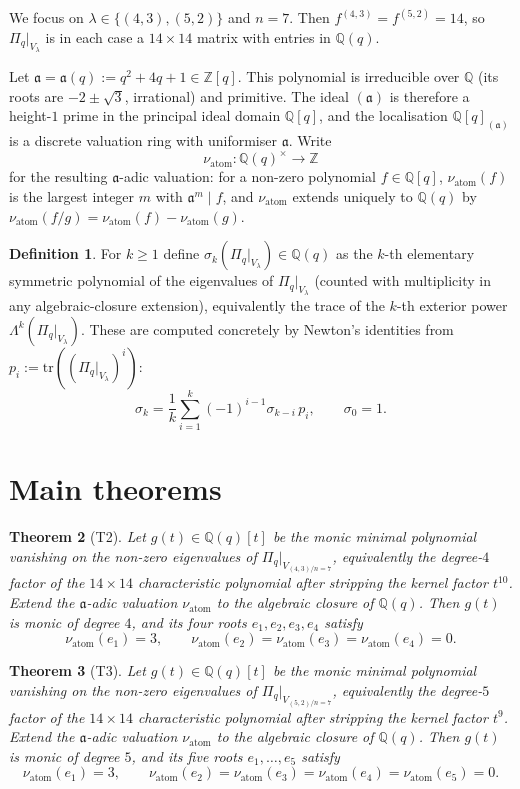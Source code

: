\documentclass[11pt]{article}
\theoremstyle{plain}
\newtheorem{theorem}{Theorem}
\theoremstyle{definition}
\newtheorem{definition}[theorem]{Definition}
\theoremstyle{remark}
\newcommand{\Z}{\mathbb{Z}}
\newcommand{\Q}{\mathbb{Q}}
\newcommand{\Pibs}{\Pi_q}
\newcommand{\Vlam}{V_\lambda}
\newcommand{\trace}{\mathrm{tr}}
\newcommand{\val}{\nu_{\mathrm{atom}}}
\newcommand{\atom}{\mathfrak{a}}
\begin{document}
We focus on $\lambda \in \{(4,3), (5,2)\}$ and $n = 7$.  Then $f^{(4,3)} = f^{(5,2)} = 14$,
so $\Pibs|_{V_\lambda}$ is in each case a $14\times 14$ matrix with entries in $\Q(q)$.

Let $\atom = \atom(q) := q^2 + 4q + 1 \in \Z[q]$.  This polynomial is irreducible
over $\Q$ (its roots are $-2 \pm \sqrt{3}$, irrational) and primitive.  The
ideal $(\atom)$ is therefore a height-$1$ prime in the principal ideal domain
$\Q[q]$, and the localisation $\Q[q]_{(\atom)}$ is a discrete valuation ring with
uniformiser $\atom$.  Write
\[ \val \colon \Q(q)^\times \longrightarrow \Z \]
for the resulting $\atom$-adic valuation: for a non-zero polynomial $f \in \Q[q]$,
$\val(f)$ is the largest integer $m$ with $\atom^m \mid f$, and $\val$ extends
uniquely to $\Q(q)$ by $\val(f/g) = \val(f) - \val(g)$.

\begin{definition}
For $k \geq 1$ define $\sigma_k(\Pibs|_{\Vlam}) \in \Q(q)$ as the $k$-th elementary
symmetric polynomial of the eigenvalues of $\Pibs|_{\Vlam}$ (counted with
multiplicity in any algebraic-closure extension), equivalently the trace of the
$k$-th exterior power $\Lambda^k(\Pibs|_{\Vlam})$.  These are computed concretely
by Newton's identities from $p_i := \trace((\Pibs|_{\Vlam})^i)$:
\[ \sigma_k = \frac{1}{k}\sum_{i=1}^{k} (-1)^{i-1} \sigma_{k-i}\, p_i,
   \qquad \sigma_0 = 1. \]
\end{definition}

\section{Main theorems}

\begin{theorem}[T2]
\label{thm:T2}
Let $g(t) \in \Q(q)[t]$ be the monic minimal polynomial vanishing on the non-zero
eigenvalues of $\Pibs|_{V_{(4,3)/n=7}}$, equivalently the degree-$4$ factor of the
$14\times 14$ characteristic polynomial after stripping the kernel factor $t^{10}$.
Extend the $\atom$-adic valuation $\val$ to the algebraic closure of $\Q(q)$.
Then $g(t)$ is monic of degree $4$, and its four roots $e_1, e_2, e_3, e_4$ satisfy
\[ \val(e_1) = 3, \qquad \val(e_2) = \val(e_3) = \val(e_4) = 0. \]
\end{theorem}

\begin{theorem}[T3]
\label{thm:T3}
Let $g(t) \in \Q(q)[t]$ be the monic minimal polynomial vanishing on the non-zero
eigenvalues of $\Pibs|_{V_{(5,2)/n=7}}$, equivalently the degree-$5$ factor of the
$14\times 14$ characteristic polynomial after stripping the kernel factor $t^{9}$.
Extend the $\atom$-adic valuation $\val$ to the algebraic closure of $\Q(q)$.
Then $g(t)$ is monic of degree $5$, and its five roots $e_1, \ldots, e_5$ satisfy
\[ \val(e_1) = 3, \qquad \val(e_2) = \val(e_3) = \val(e_4) = \val(e_5) = 0. \]
\end{theorem}
\end{document}
